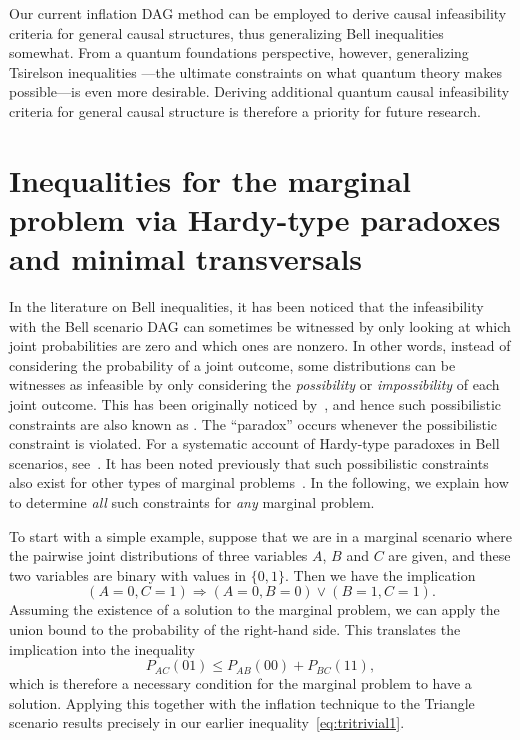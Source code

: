 Our current inflation DAG method can be employed to derive causal infeasibility criteria for general causal structures, thus generalizing Bell inequalities somewhat. From a quantum foundations perspective, however, generalizing Tsirelson inequalities \cite{Tsirelson1980,Brunner2013Bell}---the ultimate constraints on what quantum theory makes possible---is even more desirable. Deriving additional quantum causal infeasibility criteria for general causal structure is therefore a priority for future research. 

\section{Inequalities for the marginal problem via Hardy-type paradoxes and minimal transversals}\label{sec:TSEM}

In the literature on Bell inequalities, it has been noticed that the infeasibility with the Bell scenario DAG can sometimes be witnessed by only looking at which joint probabilities are zero and which ones are nonzero. In other words, instead of considering the probability of a joint outcome, some distributions can be witnesses as infeasible by only considering the \emph{possibility} or \emph{impossibility} of each joint outcome. This has been originally noticed by~\citet{L.Hardy:PRL:1665}, and hence such possibilistic constraints are also known as . The ``paradox'' occurs whenever the possibilistic constraint is violated. For a systematic account of Hardy-type paradoxes in Bell scenarios, see~\cite{Mansfield2012}. It has been noted previously that such possibilistic constraints also exist for other types of marginal problems~\cite[Section~III.C]{LSW}. In the following, we explain how to determine \emph{all} such constraints for \emph{any} marginal problem.

To start with a simple example, suppose that we are in a marginal scenario where the pairwise joint distributions of three variables $A$, $B$ and $C$ are given, and these two variables are binary with values in $\{0,1\}$. Then we have the implication
\[
	(A=0,C=1) \Longrightarrow (A=0,B=0) \lor (B=1,C=1).
\]
Assuming the existence of a solution to the marginal problem, we can apply the union bound to the probability of the right-hand side. This translates the implication into the inequality
\[
	P_{AC}(01) \leq P_{AB}(00) + P_{BC}(11),
\]
which is therefore a necessary condition for the marginal problem to have a solution. Applying this together with the inflation technique to the Triangle scenario results precisely in our earlier inequality~\cref{eq:tritrivial1}.

